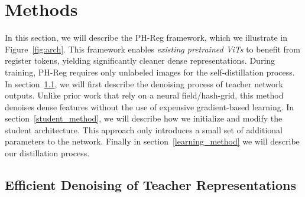 \section{Methods}
\vspace{-.2cm}
In this section, we will describe the PH-Reg framework, which we illustrate in Figure~\ref{fig:arch}. This framework enables \emph{existing pretrained ViTs} to benefit from register tokens, yielding significantly cleaner dense representations. During training, PH-Reg requires only unlabeled images for the self-distillation process. In section~\ref{teacher_method}, we will first describe the denoising process of teacher network outputs. Unlike prior work that rely on a neural field/hash-grid, this method denoises dense features without the use of expensive gradient-based learning. In section~\ref{student_method}, we will describe how we initialize and modify the student architecture. This approach only introduces a small set of additional parameters to the network. Finally in section~\ref{learning_method} we will describe our distillation process. 



\vspace{-.2cm}
\subsection{Efficient Denoising of Teacher Representations}
\label{teacher_method}
\vspace{-.2cm}

